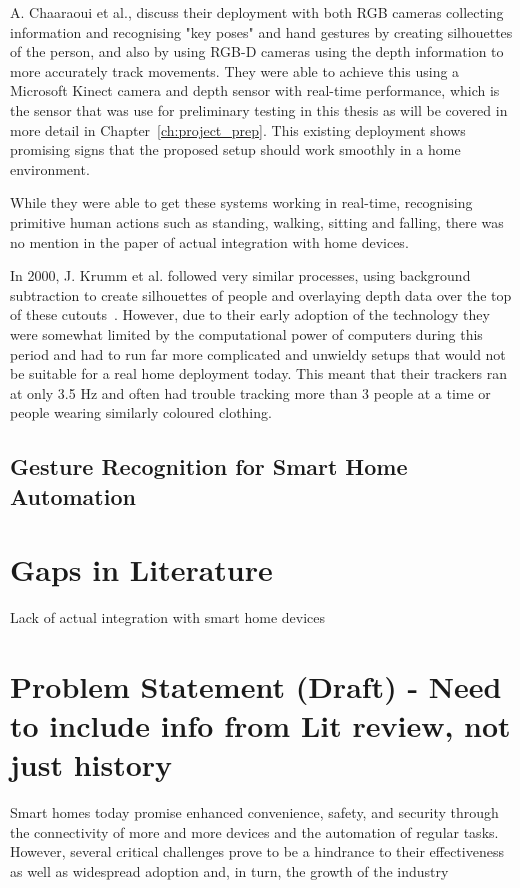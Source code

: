 A. Chaaraoui et al., discuss their deployment with both RGB cameras collecting information and recognising "key poses" and hand gestures by creating silhouettes of the person, and also by using RGB-D cameras using the depth information to more accurately track movements.
They were able to achieve this using a Microsoft Kinect camera and depth sensor with real-time performance, which is the sensor that was use for preliminary testing in this thesis as will be covered in more detail in Chapter~\ref{ch:project_prep}.
This existing deployment shows promising signs that the proposed setup should work smoothly in a home environment.

While they were able to get these systems working in real-time, recognising primitive human actions such as standing, walking, sitting and falling, there was no mention in the paper of actual integration with home devices.

In 2000, J. Krumm et al. followed very similar processes, using background subtraction to create silhouettes of people and overlaying depth data over the top of these cutouts~\cite{Krum00}.
However, due to their early adoption of the technology they were somewhat limited by the computational power of computers during this period and had to run far more complicated and unwieldy setups that would not be suitable for a real home deployment today.
This meant that their trackers ran at only 3.5 Hz and often had trouble tracking more than 3 people at a time or people wearing similarly coloured clothing.

\subsection{Gesture Recognition for Smart Home Automation}

\section{Gaps in Literature}
Lack of actual integration with smart home devices

\section{Problem Statement (Draft) - Need to include info from Lit review, not just history}
Smart homes today promise enhanced convenience, safety, and security through the connectivity of more and more devices and the automation of regular tasks.
However, several critical challenges prove to be a hindrance to their effectiveness as well as widespread adoption and, in turn, the growth of the industry

